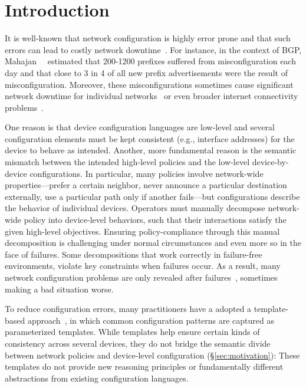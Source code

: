 \section{Introduction}
\label{sec:introduction}

It is well-known that network configuration is highly error 
prone and that such errors can lead to costly network 
downtime~\cite{mahajan+:bgp-misconfiguration,feamster+:rcc,batfish}.  
For instance, in the context of BGP, Mahajan~~\cite{mahajan+:bgp-misconfiguration} 
estimated that 200-1200 prefixes suffered from
misconfiguration each day and that close to 3 in 4 of all
new prefix advertisements were the result of misconfiguration.
Moreover, these misconfigurations sometimes cause significant network downtime for
individual networks~\cite{time-warner} or even broader internet connectivity problems~\cite{routing-instability,mahajan+:bgp-misconfiguration}.

One reason is that device configuration languages are low-level and several configuration elements must be kept consistent (e.g., interface addresses) for the device to behave as intended.
Another, more fundamental reason is the semantic mismatch between the intended high-level
policies and the low-level device-by-device configurations.  In particular,
many policies involve network-wide properties---prefer a certain neighbor,
never announce a particular destination externally, 
use a particular path only if another fails---but configurations describe the behavior of 
individual devices.
%
Operators must manually decompose network-wide policy into device-level behaviors, such that their interactions satisfy the given high-level objectives.
%
Ensuring policy-compliance through this manual decomposition is challenging under normal
circumstances and even more so in the face of failures. Some decompositions that work correctly 
in failure-free environments, violate key constraints when failures occur.
%
As a result, many network configuration problems are only revealed after failures~\cite{batfish},
sometimes making a bad situation worse.

To reduce configuration errors, many practitioners have a adopted a template-based 
approach~\cite{x,y}, in which common configuration patterns are captured as parameterized templates.
 While templates help ensure certain kinds of consistency across several devices, they do not 
bridge the 
semantic divide between network policies and device-level configuration (\S\ref{sec:motivation}):
These templates do not provide new reasoning principles or fundamentally different abstractions 
from existing configuration languages.

